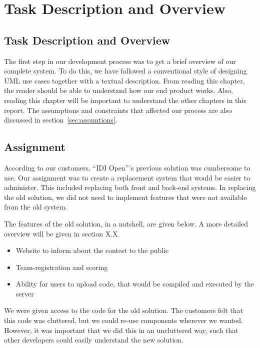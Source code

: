 \chapter{Task Description and Overview}

\section{Task Description and Overview}
\label{sec:taskdesc}

The first step in our development process was to get a brief overview of
our complete system. To do this, we have followed a conventional style
of designing UML use cases together with a textual description. From
reading this chapter, the reader should be able to understand how our
end product works. Also, reading this chapter will be important to
understand the other chapters in this report. The assumptions and
constraints that affected our process are also discussed in section~\ref{sec:assumtions}. 

\section{Assignment}
According to our customers, ``IDI Open'''s previous solution was
cumbersome to use. Our assignment was to create a replacement system
that would be easier to administer.
This included replacing both front and back-end systems. In replacing
the old solution, we did not need to implement features that were not
available from the old system. 

The features of the old solution, in a nutshell, are given below. A more
detailed overview will be given in section X.X.
\begin{itemize}
\item Website to inform about the contest to the public
\item Team-registration and scoring
\item Ability for users to upload code, that would be compiled and executed by the server
\end{itemize}

We were given access to the code for the old solution. The customers
felt that this code was cluttered, but we could re-use components
wherever we wanted. However, it was important that we did this in an
uncluttered way, such that other developers could easily understand the
new solution.

